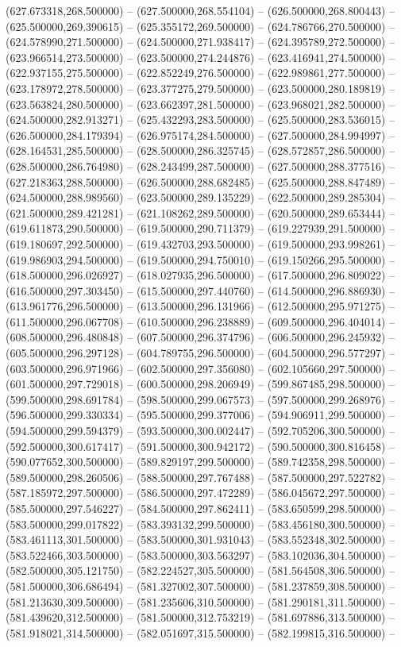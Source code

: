 (627.673318,268.500000) -- (627.500000,268.554104) -- (626.500000,268.800443) -- (625.500000,269.390615) -- (625.355172,269.500000) -- (624.786766,270.500000) -- (624.578990,271.500000) -- (624.500000,271.938417) -- (624.395789,272.500000) -- (623.966514,273.500000) -- (623.500000,274.244876) -- (623.416941,274.500000) -- (622.937155,275.500000) -- (622.852249,276.500000) -- (622.989861,277.500000) -- (623.178972,278.500000) -- (623.377275,279.500000) -- (623.500000,280.189819) -- (623.563824,280.500000) -- (623.662397,281.500000) -- (623.968021,282.500000) -- (624.500000,282.913271) -- (625.432293,283.500000) -- (625.500000,283.536015) -- (626.500000,284.179394) -- (626.975174,284.500000) -- (627.500000,284.994997) -- (628.164531,285.500000) -- (628.500000,286.325745) -- (628.572857,286.500000) -- (628.500000,286.764980) -- (628.243499,287.500000) -- (627.500000,288.377516) -- (627.218363,288.500000) -- (626.500000,288.682485) -- (625.500000,288.847489) -- (624.500000,288.989560) -- (623.500000,289.135229) -- (622.500000,289.285304) -- (621.500000,289.421281) -- (621.108262,289.500000) -- (620.500000,289.653444) -- (619.611873,290.500000) -- (619.500000,290.711379) -- (619.227939,291.500000) -- (619.180697,292.500000) -- (619.432703,293.500000) -- (619.500000,293.998261) -- (619.986903,294.500000) -- (619.500000,294.750010) -- (619.150266,295.500000) -- (618.500000,296.026927) -- (618.027935,296.500000) -- (617.500000,296.809022) -- (616.500000,297.303450) -- (615.500000,297.440760) -- (614.500000,296.886930) -- (613.961776,296.500000) -- (613.500000,296.131966) -- (612.500000,295.971275) -- (611.500000,296.067708) -- (610.500000,296.238889) -- (609.500000,296.404014) -- (608.500000,296.480848) -- (607.500000,296.374796) -- (606.500000,296.245932) -- (605.500000,296.297128) -- (604.789755,296.500000) -- (604.500000,296.577297) -- (603.500000,296.971966) -- (602.500000,297.356080) -- (602.105660,297.500000) -- (601.500000,297.729018) -- (600.500000,298.206949) -- (599.867485,298.500000) -- (599.500000,298.691784) -- (598.500000,299.067573) -- (597.500000,299.268976) -- (596.500000,299.330334) -- (595.500000,299.377006) -- (594.906911,299.500000) -- (594.500000,299.594379) -- (593.500000,300.002447) -- (592.705206,300.500000) -- (592.500000,300.617417) -- (591.500000,300.942172) -- (590.500000,300.816458) -- (590.077652,300.500000) -- (589.829197,299.500000) -- (589.742358,298.500000) -- (589.500000,298.260506) -- (588.500000,297.767488) -- (587.500000,297.522782) -- (587.185972,297.500000) -- (586.500000,297.472289) -- (586.045672,297.500000) -- (585.500000,297.546227) -- (584.500000,297.862411) -- (583.650599,298.500000) -- (583.500000,299.017822) -- (583.393132,299.500000) -- (583.456180,300.500000) -- (583.461113,301.500000) -- (583.500000,301.931043) -- (583.552348,302.500000) -- (583.522466,303.500000) -- (583.500000,303.563297) -- (583.102036,304.500000) -- (582.500000,305.121750) -- (582.224527,305.500000) -- (581.564508,306.500000) -- (581.500000,306.686494) -- (581.327002,307.500000) -- (581.237859,308.500000) -- (581.213630,309.500000) -- (581.235606,310.500000) -- (581.290181,311.500000) -- (581.439620,312.500000) -- (581.500000,312.753219) -- (581.697886,313.500000) -- (581.918021,314.500000) -- (582.051697,315.500000) -- (582.199815,316.500000) -- 
